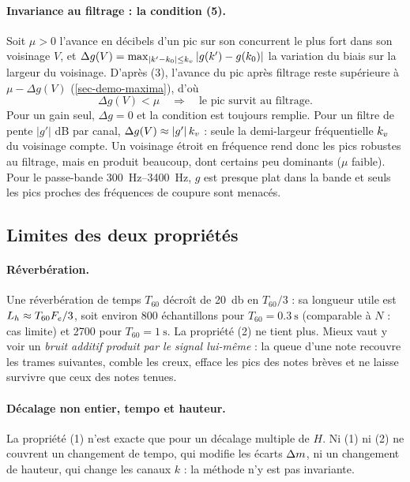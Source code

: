 \paragraph{Invariance au filtrage : la condition (5).} Soit $\mu > 0$ l'avance en décibels
d'un pic sur son concurrent le plus fort dans son voisinage $V$, et
$\Delta g(V) = \max_{|k'-k_0| \le k_v} |g(k') - g(k_0)|$ la variation du biais sur la largeur
du voisinage. D'après (3), l'avance du pic après filtrage reste supérieure à
$\mu - \Delta g(V)$ (\cref{sec-demo-maxima}), d'où
\begin{equation}
  \Delta g(V) < \mu \quad \Longrightarrow \quad \text{le pic survit au filtrage.}
  \tag{5}
\end{equation}
Pour un gain seul, $\Delta g = 0$ et la condition est toujours remplie. Pour un filtre de
pente $|g'|$ dB par canal, $\Delta g(V) \approx |g'|\,k_v$ : seule la demi-largeur
fréquentielle $k_v$ du voisinage compte. Un voisinage étroit en fréquence rend donc les pics
robustes au filtrage, mais en produit beaucoup, dont certains peu dominants ($\mu$ faible).
Pour le passe-bande \qtyrange{300}{3400}{\hertz}, $g$ est presque plat dans la bande et seuls
les pics proches des fréquences de coupure sont menacés.

\subsection{Limites des deux propriétés}
\label{sec-limites}

\paragraph{Réverbération.} Une réverbération de temps $T_{60}$ décroît de
\qty{20}{\decibel} en $T_{60}/3$ : sa longueur utile est $L_h \approx T_{60}F_e/3$, soit
environ 800 échantillons pour $T_{60} = \qty{0.3}{\second}$ (comparable à $N$ : cas limite) et
\num{2700} pour $T_{60} = \qty{1}{\second}$. La propriété (2) ne tient plus. Mieux vaut y voir
un \emph{bruit additif produit par le signal lui-même} : la queue d'une note recouvre les
trames suivantes, comble les creux, efface les pics des notes brèves et ne laisse survivre
que ceux des notes tenues.

\paragraph{Décalage non entier, tempo et hauteur.} La propriété (1) n'est exacte que pour un
décalage multiple de $H$. Ni (1) ni (2) ne couvrent un changement de tempo, qui modifie les
écarts $\Delta m$, ni un changement de hauteur, qui change les canaux $k$ : la méthode n'y est pas
invariante.
